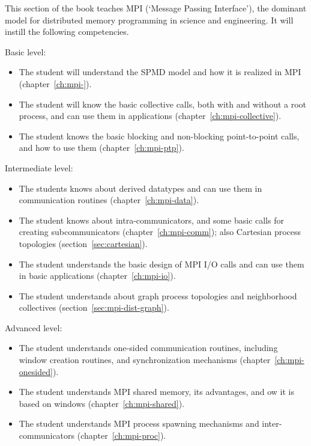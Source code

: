 
This section of the book teaches MPI (`Message Passing Interface'),
the dominant model for distributed memory programming in science and engineering.
It will instill the following competencies.

Basic level:
\begin{itemize}
\item The student will understand the \acs{SPMD} model
  and how it is realized in MPI (chapter~\ref{ch:mpi-}).
\item The student will know the basic collective calls,
  both with and without a root process,
  and can use them in applications
  (chapter~\ref{ch:mpi-collective}).
\item The student knows the basic blocking and non-blocking
  point-to-point calls,
  and how to use them
  (chapter~\ref{ch:mpi-ptp}).
\end{itemize}

Intermediate level:
\begin{itemize}
\item The students knows about derived datatypes and can use them
  in communication routines
  (chapter~\ref{ch:mpi-data}).
\item The student knows about intra-communicators,
  and some basic calls for creating subcommunicators
  (chapter~\ref{ch:mpi-comm});
  also Cartesian process topologies
  (section~\ref{sec:cartesian}).
\item The student understands the basic design of MPI I/O calls
  and can use them in basic applications
  (chapter~\ref{ch:mpi-io}).
\item The student understands about graph process topologies
  and neighborhood collectives
  (section~\ref{sec:mpi-dist-graph}).
\end{itemize}

Advanced level:
\begin{itemize}
\item The student understands one-sided communication routines,
  including window creation routines, and synchronization mechanisms
  (chapter~\ref{ch:mpi-onesided}).
\item The student understands MPI shared memory, its advantages,
  and ow it is based on windows
  (chapter~\ref{ch:mpi-shared}).
\item The student understands MPI process spawning mechanisms
  and inter-communicators
  (chapter~\ref{ch:mpi-proc}).
\end{itemize}
